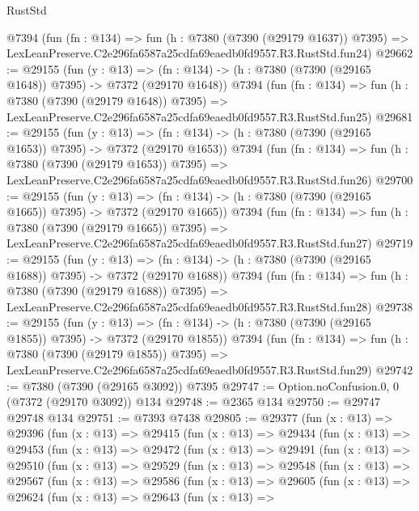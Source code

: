 \begin{lexlean}{RustStd}
\begin{coremodule}
    @7394
    (fun (fn : @134) =>
    fun (h : @7380 (@7390 (@29179 @1637)) @7395) =>
    LexLeanPreserve.C2e296fa6587a25cdfa69eaedb0fd9557.R3.RustStd.fun24)
@29662 := @29155
    (fun (y : @13) =>
    (fn : @134) -> (h : @7380 (@7390 (@29165 @1648)) @7395) -> @7372 (@29170 @1648))
    @7394
    (fun (fn : @134) =>
    fun (h : @7380 (@7390 (@29179 @1648)) @7395) =>
    LexLeanPreserve.C2e296fa6587a25cdfa69eaedb0fd9557.R3.RustStd.fun25)
@29681 := @29155
    (fun (y : @13) =>
    (fn : @134) -> (h : @7380 (@7390 (@29165 @1653)) @7395) -> @7372 (@29170 @1653))
    @7394
    (fun (fn : @134) =>
    fun (h : @7380 (@7390 (@29179 @1653)) @7395) =>
    LexLeanPreserve.C2e296fa6587a25cdfa69eaedb0fd9557.R3.RustStd.fun26)
@29700 := @29155
    (fun (y : @13) =>
    (fn : @134) -> (h : @7380 (@7390 (@29165 @1665)) @7395) -> @7372 (@29170 @1665))
    @7394
    (fun (fn : @134) =>
    fun (h : @7380 (@7390 (@29179 @1665)) @7395) =>
    LexLeanPreserve.C2e296fa6587a25cdfa69eaedb0fd9557.R3.RustStd.fun27)
@29719 := @29155
    (fun (y : @13) =>
    (fn : @134) -> (h : @7380 (@7390 (@29165 @1688)) @7395) -> @7372 (@29170 @1688))
    @7394
    (fun (fn : @134) =>
    fun (h : @7380 (@7390 (@29179 @1688)) @7395) =>
    LexLeanPreserve.C2e296fa6587a25cdfa69eaedb0fd9557.R3.RustStd.fun28)
@29738 := @29155
    (fun (y : @13) =>
    (fn : @134) -> (h : @7380 (@7390 (@29165 @1855)) @7395) -> @7372 (@29170 @1855))
    @7394
    (fun (fn : @134) =>
    fun (h : @7380 (@7390 (@29179 @1855)) @7395) =>
    LexLeanPreserve.C2e296fa6587a25cdfa69eaedb0fd9557.R3.RustStd.fun29)
@29742 := @7380 (@7390 (@29165 @3092)) @7395
@29747 := Option.noConfusion.{0, 0} (@7372 (@29170 @3092)) @134
@29748 := @2365 @134
@29750 := @29747 @29748 @134
@29751 := @7393 @7438
@29805 := @29377
    (fun (x : @13) =>
    @29396
      (fun (x : @13) =>
      @29415
        (fun (x : @13) =>
        @29434
          (fun (x : @13) =>
          @29453
            (fun (x : @13) =>
            @29472
              (fun (x : @13) =>
              @29491
                (fun (x : @13) =>
                @29510
                  (fun (x : @13) =>
                  @29529
                    (fun (x : @13) =>
                    @29548
                      (fun (x : @13) =>
                      @29567
                        (fun (x : @13) =>
                        @29586
                          (fun (x : @13) =>
                          @29605
                            (fun (x : @13) =>
                            @29624
                              (fun (x : @13) =>
                              @29643
                                (fun (x : @13) =>

\end{coremodule}
\end{lexlean}
